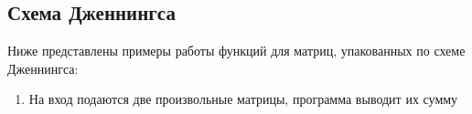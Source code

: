 \documentclass[12pt, a4paper]{article}
\begin{document}
\subsection{Схема Дженнингса}
Ниже представлены примеры работы функций для матриц, упакованных по схеме 
Дженнингса:
\begin{enumerate}
	\item На вход подаются две произвольные матрицы, программа выводит их сумму
	\begin{figure}[h]

\end{figure}
\end{enumerate}
\end{document}
